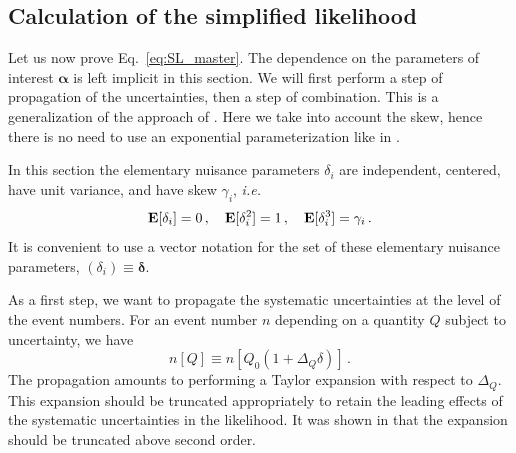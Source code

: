 \documentclass[11pt]{article}
\def\ie{{\it i.e.}}
\newcommand{\be}{\begin{equation}}
\newcommand{\ee}{\end{equation}}
\begin{document}
\subsection{Calculation of the simplified likelihood}
\label{se:analytic}

Let us now prove Eq.~\eqref{eq:SL_master}.  The dependence on the parameters of interest $\bm{\alpha}$ is left implicit in this section. We will first perform a step of  propagation of the uncertainties, then a step of combination. This is a generalization of the approach of \cite{Fichet:2016gvx}. Here we take into account the skew, hence there is no need to use an exponential parameterization like in \cite{Fichet:2016gvx}.

In this section the elementary nuisance parameters $\delta_i$ are independent, centered, have unit variance, and have skew $\gamma_i$, \ie
\be
{\bf E}[\delta_i]=0\,,\quad {\bf E}[\delta_i^2]=1 \,,\quad {\bf E}[\delta_i^3]=\gamma_i\,.
\ee
It is  convenient to use a vector notation for the set of these elementary nuisance parameters, $(\delta_i)\equiv \boldsymbol{\delta} $.



As a first step, we want to propagate the systematic uncertainties at the level of the event numbers.  For an event number $n$ depending on a quantity $Q$ subject to uncertainty, we have
\be n[Q]\equiv n[Q_0(1+\Delta_Q \delta)]\,.
\ee
The propagation amounts to performing a Taylor expansion with respect to $\Delta_Q $. This expansion should be truncated appropriately  to retain the leading effects of the systematic uncertainties in the likelihood. It was shown in \cite{Fichet:2016gvx} that  the expansion should be truncated above second order.






\end{document}
